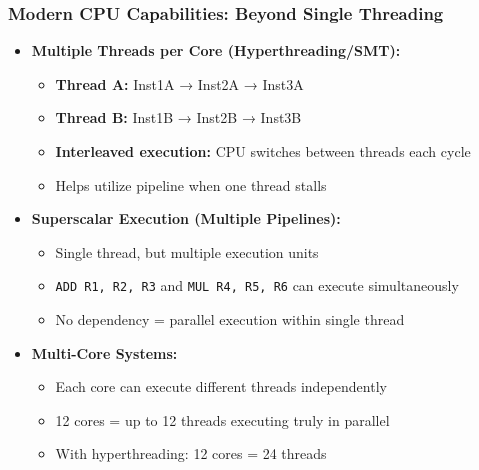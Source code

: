 \begin{frame}
\frametitle{Modern CPU Capabilities: Beyond Single Threading}
\begin{itemize}
    \item \textbf{Multiple Threads per Core (Hyperthreading/SMT):}
    \begin{itemize}
        \item \textbf{Thread A:} Inst1A → Inst2A → Inst3A
        \item \textbf{Thread B:} Inst1B → Inst2B → Inst3B
        \item \textbf{Interleaved execution:} CPU switches between threads each cycle
        \item Helps utilize pipeline when one thread stalls
    \end{itemize}
    \item \textbf{Superscalar Execution (Multiple Pipelines):}
    \begin{itemize}
        \item Single thread, but multiple execution units
        \item \texttt{ADD R1, R2, R3} and \texttt{MUL R4, R5, R6} can execute simultaneously
        \item No dependency = parallel execution within single thread
    \end{itemize}
    \item \textbf{Multi-Core Systems:}
    \begin{itemize}
        \item Each core can execute different threads independently
        \item 12 cores = up to 12 threads executing truly in parallel
        \item With hyperthreading: 12 cores = 24 threads
    \end{itemize}
\end{itemize}
\end{frame}

